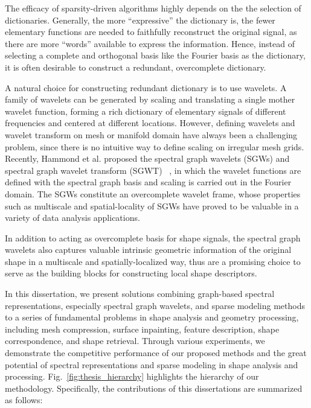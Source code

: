 The efficacy of sparsity-driven algorithms highly depends on the the selection of dictionaries.
Generally, the more ``expressive'' the dictionary is, the fewer elementary functions
are needed to faithfully reconstruct the original signal, as there are more ``words''
available to express the information. Hence, instead of selecting a complete and orthogonal basis
like the Fourier basis as the dictionary, it is often desirable to construct a redundant, overcomplete
dictionary. 

A natural choice for constructing redundant dictionary is to use wavelets. A family
of wavelets can be generated by scaling and translating a single mother wavelet function,
forming a rich dictionary of elementary signals of different frequencies and centered
at different locations. However, defining wavelets and wavelet transform on mesh or
manifold domain have always been a challenging problem, since there is no intuitive way
to define scaling on irregular mesh grids. Recently, Hammond et al. proposed the spectral
graph wavelets (SGWs) and spectral graph wavelet transform (SGWT)~\cite{Hammond2011}
, in which the wavelet functions are defined with the spectral graph basis and scaling is carried
out in the Fourier domain. The SGWs constitute an overcomplete wavelet frame, whose properties
such as multiscale and spatial-locality of SGWs have proved to be valuable in a variety of data
analysis applications.

In addition to acting as overcomplete basis for shape signals, the spectral
graph wavelets also captures valuable intrinsic geometric information of the original
shape in a multiscale and spatially-localized way, thus are a promising choice to
serve as the building blocks for constructing local shape descriptors.

In this dissertation, we present solutions combining graph-based spectral
representations, especially spectral graph wavelets, and sparse modeling
methods to a series of fundamental problems in shape analysis and geometry 
processing, including mesh compression, surface inpainting, feature description, 
shape correspondence, and shape retrieval. Through various experiments, we 
demonstrate the competitive performance of our proposed methods and the great 
potential of spectral representations and sparse modeling in shape analysis and processing. 
Fig.~\ref{fig:thesis_hierarchy} highlights the hierarchy of our methodology. 
Specifically, the contributions of this dissertations are summarized as follows:

